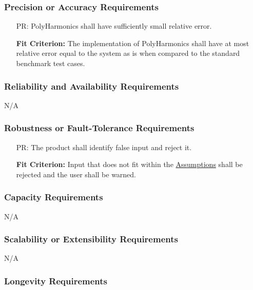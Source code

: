 \documentclass[12pt]{article}
\newcounter{perfnum}
\newcommand{\progname}{PolyHarmonics}
\begin{document}
\subsubsection{Precision or Accuracy Requirements}

\noindent \begin{itemize}
\item[PR\refstepcounter{perfnum}\theperfnum\label{NF_PA}:] \progname{} shall
  have sufficiently small relative error.

  \textbf{Fit Criterion:} The implementation of \progname{} shall have at most
  relative error equal to the system as is when compared to the standard
  benchmark test cases.
\end{itemize}

\subsubsection{Reliability and Availability Requirements}

N/A

\subsubsection{Robustness or Fault-Tolerance Requirements}

\noindent \begin{itemize}
\item[PR\refstepcounter{perfnum}\theperfnum\label{NF_FT}:] The product shall
  identify false input and reject it.

  \textbf{Fit Criterion:} Input that does not fit within the
  \hyperref[Assumptions]{Assumptions} shall be rejected and the user shall 
  be warned.
\end{itemize}

\subsubsection{Capacity Requirements}

N/A

\subsubsection{Scalability or Extensibility Requirements}

N/A

\subsubsection{Longevity Requirements}
\end{document}

